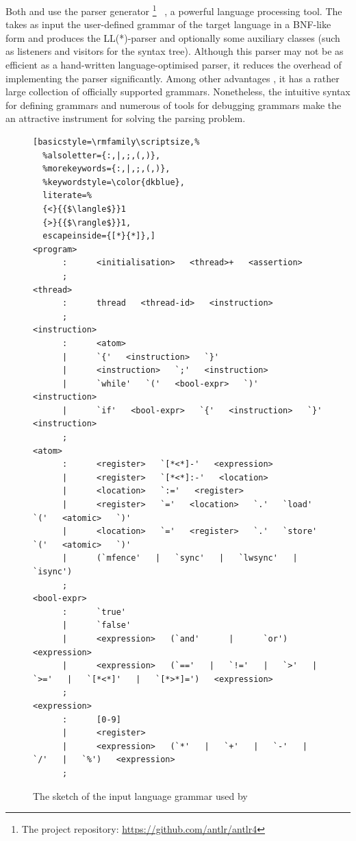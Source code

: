 Both \porthos{} and \porthos[2] use the  parser generator%
%
\footnote{The  project repository: \url{https://github.com/antlr/antlr4}}%
%
~\cite{parr2013definitive}, a powerful language processing tool.
The  takes as input the user-defined grammar of the target language in a BNF-like form and produces the LL(*)-parser and optionally some auxiliary classes (such as listeners and visitors for the syntax tree).
Although this parser may not be as efficient as a hand-written language-optimised parser, it reduces the overhead of implementing the parser significantly.
Among other advantages , it has a rather large collection of officially supported grammars.
Nonetheless, the intuitive syntax for defining grammars and numerous of tools for debugging grammars make the  an attractive instrument for solving the parsing problem.

\begin{figure}[t]%
\centering
\begin{lstlisting}[basicstyle=\rmfamily\scriptsize,%
  %alsoletter={:,|,;,(,)},
  %morekeywords={:,|,;,(,)},
  %keywordstyle=\color{dkblue},
  literate=%
  {<}{{$\langle$}}1
  {>}{{$\rangle$}}1,
  escapeinside={[*}{*]},]
<program>
      :      <initialisation>   <thread>+   <assertion>
      ;
<thread>   
      :      thread   <thread-id>   <instruction>
      ;
<instruction>
      :      <atom>
      |      `{'   <instruction>   `}'
      |      <instruction>   `;'   <instruction>
      |      `while'   `('   <bool-expr>   `)'   <instruction>
      |      `if'   <bool-expr>   `{'   <instruction>   `}'   <instruction>
      ;
<atom>   
      :      <register>   `[*<*]-'   <expression>
      |      <register>   `[*<*]:-'   <location>
      |      <location>   `:='   <register>
      |      <register>   `='   <location>   `.'   `load'      `('   <atomic>   `)'
      |      <location>   `='   <register>   `.'   `store'   `('   <atomic>   `)'
      |      (`mfence'   |   `sync'   |   `lwsync'   |   `isync')
      ;
<bool-expr>
      :      `true'
      |      `false'
      |      <expression>   (`and'      |      `or')   <expression>
      |      <expression>   (`=='   |   `!='   |   `>'   |   `>='   |   `[*<*]'   |   `[*>*]=')   <expression>
      ;
<expression>   
      :      [0-9]
      |      <register>
      |      <expression>   (`*'   |   `+'   |   `-'   |   `/'   |   `%')   <expression>
      ;
\end{lstlisting}
\caption{The sketch of the input language grammar used by \oldporthos}
\label{fig:in_grammar_pts}
\end{figure}

